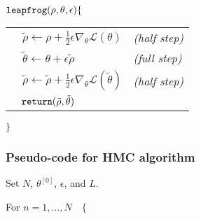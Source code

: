 {\singlespacing

${\tt leapfrog} (\rho, \theta, \epsilon) \{$ 

\begin{tabular}{ll}
$\quad \tilde{\rho} \leftarrow \rho + \tfrac{1}{2}\epsilon \nabla_\theta \mathcal{L}(\theta)$ & {\it (half step)} \\

$\quad \tilde{\theta} \leftarrow \theta + \epsilon \tilde{\rho}$ & {\it (full step)} \\

$\quad \tilde{\rho} \leftarrow \tilde{\rho} + \tfrac{1}{2}\epsilon \nabla_\theta \mathcal{L}(\tilde{\theta})$ & {\it (half step)} \\

$\quad {\tt return} (\tilde{\rho}, \tilde{\theta})$
\end{tabular}

$\}$

}

\subsubsection{Pseudo-code for HMC algorithm}


\noindent Set $N$, $\theta^{[0]}$, $\epsilon$, and $L$.

\noindent For $n = 1, \dots, N \quad \{$ 

